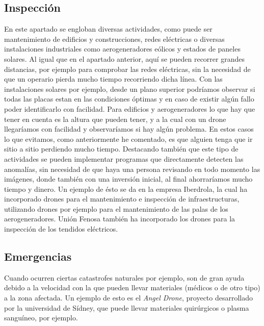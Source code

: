 	\subsection{Inspecci\'on} 
\hspace{1 cm}En este apartado se engloban diversas actividades, como puede ser mantenimiento de edificios y construcciones, redes el\'ectricas o diversas instalaciones industriales como aerogeneradores e\'olicos y estados de paneles solares. Al igual que en el apartado anterior, aqu\'i se pueden recorrer grandes distancias, por ejemplo para comprobar las redes el\'ectricas, sin la necesidad de que un operario pierda mucho tiempo recorriendo dicha l\'inea. Con las instalaciones solares por ejemplo, desde un plano superior podr\'iamos observar si todas las placas estan en las condiciones \'optimas y en caso de existir alg\'un fallo poder identificarlo con facilidad. Para edificios y aerogeneradores lo que hay que tener en cuenta es la altura que pueden tener, y a la cual con un drone llegar\'iamos con facilidad y observar\'iamos si hay alg\'un problema. En estos casos lo que evitamos, como anteriormente he comentado, es que alguien tenga que ir sitio a sitio perdiendo mucho tiempo. Destacando tambi\'en que este tipo de actividades se pueden implementar programas que directamente detecten las anomal\'ias, sin necesidad de que haya una persona revisando en todo momento las im\'agenes, donde tambi\'en con una inversi\'on inicial, al final ahorrar\'iamos mucho tiempo y dinero. Un ejemplo de \'esto se da en la empresa Iberdrola, la cual ha incorporado drones para el mantenimiento e inspecci\'on de infraestructuras, utilizando drones por ejemplo para el mantenimiento de las palas de los aerogeneradores. Uni\'on Fenosa tambi\'en ha incorporado los drones para la inspecci\'on de los tendidos el\'ectricos. 


	\subsection{Emergencias}
\hspace{1 cm} Cuando ocurren ciertas catastrofes naturales por ejemplo, son de gran ayuda debido a la velocidad con la que pueden llevar materiales (m\'edicos o de otro tipo) a la zona afectada. Un ejemplo de esto es el \textit{Angel Drone}, proyecto desarrollado por la universidad de S\'idney, que puede llevar materiales quir\'urgicos o plasma sangu\'ineo, por ejemplo.

